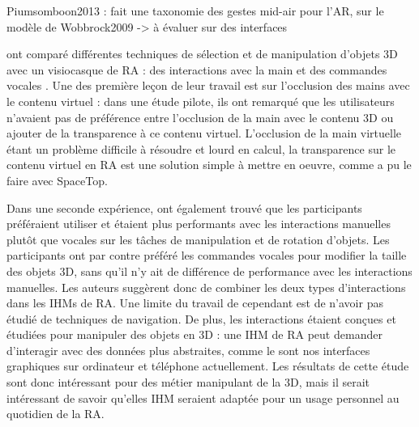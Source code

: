 Piumsomboon2013 : fait une taxonomie des gestes mid-air pour l'AR, sur le modèle de Wobbrock2009 -> à évaluer sur des interfaces

\cite{Piumsomboon2014} ont comparé différentes techniques de sélection et de manipulation d'objets 3D avec un visiocasque de RA : des interactions avec la main et des commandes vocales . Une des première leçon de leur travail est sur l'occlusion des mains avec le contenu virtuel : dans une étude pilote, ils ont remarqué que les utilisateurs n'avaient pas de préférence entre l'occlusion de la main avec le contenu 3D ou ajouter de la transparence à ce contenu virtuel. L'occlusion de la main virtuelle étant un problème difficile à résoudre et lourd en calcul, la transparence sur le contenu virtuel en RA est une solution simple à mettre en oeuvre, comme a pu le faire \cite{Lee2013} avec SpaceTop.

Dans une seconde expérience, \citeauthor{Piumsomboon2014} ont également trouvé que les participants préféraient utiliser et étaient plus performants avec les interactions manuelles plutôt que vocales sur les tâches de manipulation et de rotation d'objets. Les participants ont par contre préféré les commandes vocales pour modifier la taille des objets 3D, sans qu'il n'y ait de différence de performance avec les interactions manuelles. Les auteurs suggèrent donc de combiner les deux types d'interactions dans les IHMs de RA. Une limite du travail de \citeauthor{Piumsomboon2014} cependant est de n'avoir pas étudié de techniques de navigation. De plus, les interactions étaient conçues et étudiées pour manipuler des objets en 3D : une IHM de RA peut demander d'interagir avec des données plus abstraites, comme le sont nos interfaces graphiques sur ordinateur et téléphone actuellement. Les résultats de cette étude sont donc intéressant pour des métier manipulant de la 3D, mais il serait intéressant de savoir qu'elles IHM seraient adaptée pour un usage personnel au quotidien de la RA.


